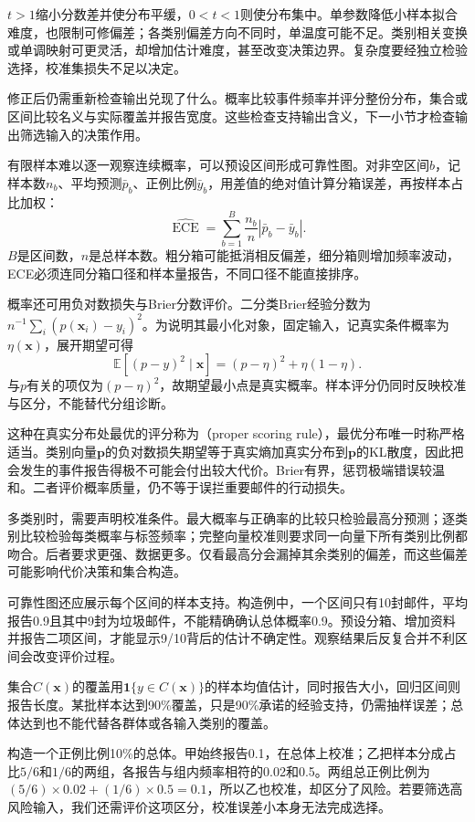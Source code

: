 $t>1$缩小分数差并使分布平缓，$0<t<1$则使分布集中。单参数降低小样本拟合难度，也限制可修偏差；各类别偏差方向不同时，单温度可能不足。类别相关变换或单调映射可更灵活，却增加估计难度，甚至改变决策边界。复杂度要经独立检验选择，校准集损失不足以决定。

修正后仍需重新检查输出兑现了什么。概率比较事件频率并评分整份分布，集合或区间比较名义与实际覆盖并报告宽度。这些检查支持输出含义，下一小节才检查输出筛选输入的决策作用。

有限样本难以逐一观察连续概率，可以预设区间形成可靠性图。对非空区间$b$，记样本数$n_b$、平均预测$\bar p_b$、正例比例$\bar y_b$，用差值的绝对值计算分箱误差，再按样本占比加权：
\begin{equation}
 \widehat{\operatorname{ECE}}
 =\sum_{b=1}^{B}\frac{n_b}{n}
       |\bar p_b-\bar y_b|.
 \label{eq:reliability-ece}
\end{equation}
$B$是区间数，$n$是总样本数。粗分箱可能抵消相反偏差，细分箱则增加频率波动，ECE必须连同分箱口径和样本量报告，不同口径不能直接排序。

概率还可用负对数损失与Brier分数评价。二分类Brier经验分数为$n^{-1}\sum_i(p(\bm{x}_i)-y_i)^2$。为说明其最小化对象，固定输入，记真实条件概率为$\eta(\bm{x})$，展开期望可得
\[
 \mathbb E[(p-y)^2\mid\bm{x}]
 =(p-\eta)^2+\eta(1-\eta).
\]
与$p$有关的项仅为$(p-\eta)^2$，故期望最小点是真实概率。样本评分仍同时反映校准与区分，不能替代分组诊断。

这种在真实分布处最优的评分称为（proper scoring rule），最优分布唯一时称严格适当。类别向量$\bm p$的负对数损失期望等于真实熵加真实分布到$\bm p$的KL散度，因此把会发生的事件报告得极不可能会付出较大代价。Brier有界，惩罚极端错误较温和。二者评价概率质量，仍不等于误拦重要邮件的行动损失。

多类别时，需要声明校准条件。最大概率与正确率的比较只检验最高分预测；逐类别比较检验每类概率与标签频率；完整向量校准则要求同一向量下所有类别比例都吻合。后者要求更强、数据更多。仅看最高分会漏掉其余类别的偏差，而这些偏差可能影响代价决策和集合构造。

可靠性图还应展示每个区间的样本支持。构造例中，一个区间只有10封邮件，平均报告0.9且其中9封为垃圾邮件，不能精确确认总体概率0.9。预设分箱、增加资料并报告二项区间，才能显示9/10背后的估计不确定性。观察结果后反复合并不利区间会改变评价过程。

集合$C(\bm{x})$的覆盖用$\mathbf 1\{y\in C(\bm{x})\}$的样本均值估计，同时报告大小，回归区间则报告长度。某批样本达到90\%覆盖，只是90\%承诺的经验支持，仍需抽样误差；总体达到也不能代替各群体或各输入类别的覆盖。

\begin{example}[校准与区分能力]
\label{ex:reliability-constant-score}
构造一个正例比例10\%的总体。甲始终报告0.1，在总体上校准；乙把样本分成占比$5/6$和$1/6$的两组，各报告与组内频率相符的0.02和0.5。两组总正例比例为$(5/6)\times0.02+(1/6)\times0.5=0.1$，所以乙也校准，却区分了风险。若要筛选高风险输入，我们还需评价这项区分，校准误差小本身无法完成选择。
\end{example}

